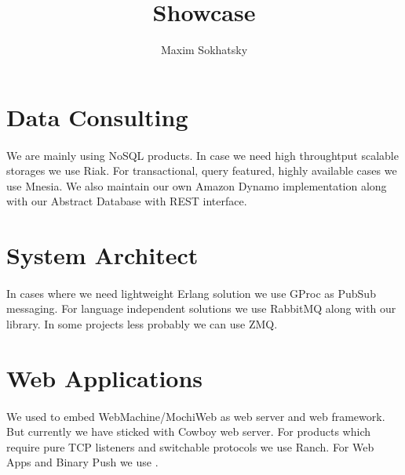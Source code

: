 \documentclass[11pt]{article}
\begin{document}
\title{Showcase}
\author{Maxim Sokhatsky}


\section*{Data Consulting}
\paragraph{}
    We are mainly using NoSQL products. In case we need high throughtput
    scalable storages we use Riak. For transactional, query featured, highly
    available cases we use Mnesia. We also maintain our own Amazon Dynamo implementation
      along with our
     Abstract Database with REST interface.

\section*{System Architect}
\paragraph{}
    In cases where we need lightweight Erlang solution we use GProc as PubSub messaging.
    For language independent solutions we use RabbitMQ along with our  library.
    In some projects less probably we can use ZMQ.

\section*{Web Applications}
\paragraph{}
    We used to embed WebMachine/MochiWeb as web server and web framework.
    But currently we have sticked with Cowboy web server.
    For products which require pure TCP listeners and switchable protocols we use Ranch.
    For Web Apps and Binary Push we use .
\end{document}
